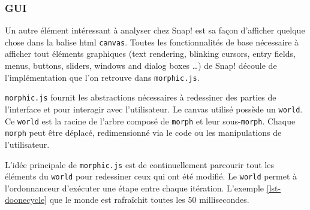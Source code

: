 % 
% 
% 

\subsubsection{GUI}
Un autre élément intéressant à analyser chez Snap! est sa façon d'afficher quelque chose dans la balise html \texttt{canvas}. Toutes les fonctionnalités de base nécessaire à afficher tout éléments graphiques (text rendering, blinking cursors, entry fields, menus, buttons, sliders, windows and dialog boxes \ldots) de Snap! découle de l'implémentation que l'on retrouve dans \texttt{morphic.js}.

\texttt{morphic.js} fournit les abstractions nécessaires à redessiner des parties de l'interface et pour interagir avec l'utilisateur. Le canvas utilisé possède un \texttt{world}. Ce \texttt{world} est la racine de l'arbre composé de \texttt{morph} et leur sous-\texttt{morph}. Chaque \texttt{morph} peut être déplacé, redimensionné via le code ou les manipulations de l'utilisateur.

L'idée principale de \texttt{morphic.js} est de continuellement parcourir tout les éléments du \texttt{world} pour redessiner ceux qui ont été modifié. Le \texttt{world} permet à l'ordonnanceur d'exécuter une étape entre chaque itération. L'exemple \ref{lst-doonecycle} que le monde est rafraîchit toutes les 50 millisecondes.

